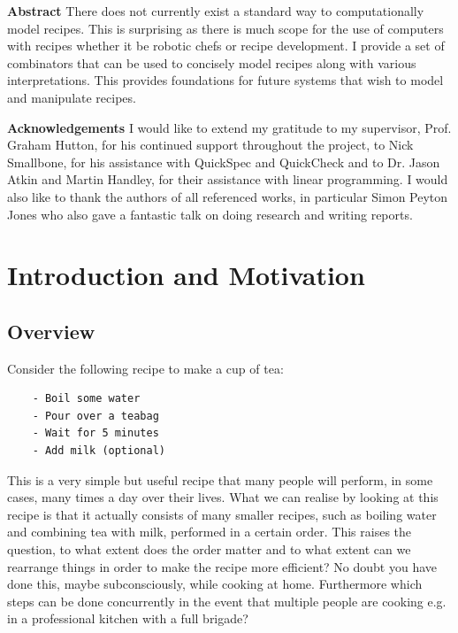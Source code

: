 \documentclass[11pt]{article}
\begin{document}

\begin{footnotesize}
\begin{center}
\textbf{Abstract}
\medbreak
There does not currently exist a standard way to
computationally model recipes. This is surprising
as there is much scope
for the use of computers with recipes whether it
be robotic chefs or recipe development.
I provide a set of combinators that can be used to
concisely model recipes along with various interpretations.
This provides foundations for future systems that wish
to model and manipulate recipes.

\vspace{1cm}

\textbf{Acknowledgements}
\medbreak
I would like to extend my gratitude to my supervisor,
Prof. Graham Hutton, for his continued support throughout
the project, to Nick Smallbone, for his assistance with QuickSpec
and QuickCheck and to Dr. Jason Atkin and Martin Handley, for
their assistance with linear programming. I would also
like to thank the authors of all referenced works, in
particular Simon Peyton Jones who also gave a fantastic
talk on doing research and writing reports.
\end{center}
\end{footnotesize}

\newpage

\tableofcontents

\newpage

\section{Introduction and Motivation}
\subsection{Overview}
Consider the following recipe to make a cup of tea:
\begin{tt}
\small
\begin{lstlisting}
    - Boil some water
    - Pour over a teabag
    - Wait for 5 minutes
    - Add milk (optional)
\end{lstlisting}
\end{tt}

This is a very simple but useful recipe that many people
will perform, in some cases, many times a day over their lives.
What we can realise by looking at this recipe is that it actually
consists of many smaller recipes, such as boiling water and
combining tea with milk, performed in a certain order. This
raises the question, to what extent does the order matter and
to what extent can we rearrange things in order to make the recipe
more efficient? No doubt you have done this, maybe subconsciously,
while cooking at home. Furthermore which steps can be done
concurrently in the event that multiple people are cooking e.g.
in a professional kitchen with a full brigade?
\end{document}
